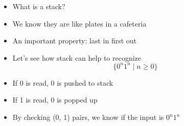 \begin{frame}[allowframebreaks]
\begin{itemize}
\item What is a stack?

\item [] We know they are like plates in a cafeteria

\item [] An important property: \alert{last in first out}
\item Let's see how stack can help to recognize
  \begin{equation*}
\{0^n 1^n\mid n \geq 0\}
\end{equation*}
\item If 0 is read, 0 is pushed to stack
\item If 1 is read, 0 is popped up
\item By checking (0, 1) pairs, we know if the input is
  $0^n 1^n$
\end{itemize}
\end{frame}

